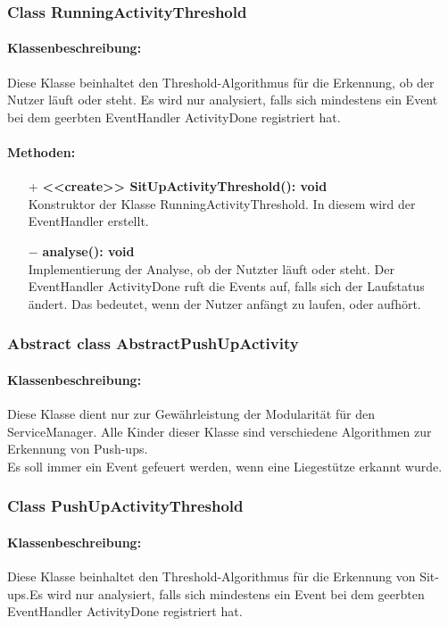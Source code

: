 \documentclass[a4paper,12pt]{article}
\begin{document}
	\subsubsection{Class RunningActivityThreshold}
	\paragraph{Klassenbeschreibung:}
	Diese Klasse beinhaltet den Threshold-Algorithmus für die Erkennung, ob der Nutzer läuft oder steht. Es wird nur analysiert, falls sich mindestens ein Event bei dem geerbten EventHandler ActivityDone registriert hat.
	\paragraph{Methoden:}
	\begin{itemize}
		\item [+]\textbf{<<create>> SitUpActivityThreshold(): void}\\Konstruktor der Klasse RunningActivityThreshold. In diesem wird der EventHandler erstellt.
		\item [$-$]\textbf{analyse(): void}\\Implementierung der Analyse, ob der Nutzter läuft oder steht. Der EventHandler ActivityDone ruft die Events auf, falls sich der Laufstatus ändert. Das bedeutet, wenn der Nutzer anfängt zu laufen, oder aufhört. 
	\end{itemize}
	
	
	\subsubsection{Abstract class AbstractPushUpActivity}
	\paragraph{Klassenbeschreibung:}
	Diese Klasse dient nur zur Gewährleistung der Modularität für den ServiceManager. Alle Kinder dieser Klasse sind verschiedene Algorithmen zur Erkennung von Push-ups.\\ Es soll immer ein Event gefeuert werden, wenn eine Liegestütze erkannt wurde.
	
	\subsubsection{Class PushUpActivityThreshold}
	\paragraph{Klassenbeschreibung:}
	Diese Klasse beinhaltet den Threshold-Algorithmus für die Erkennung von Sit-ups.Es wird nur analysiert, falls sich mindestens ein Event bei dem geerbten EventHandler ActivityDone registriert hat.
\end{document}
